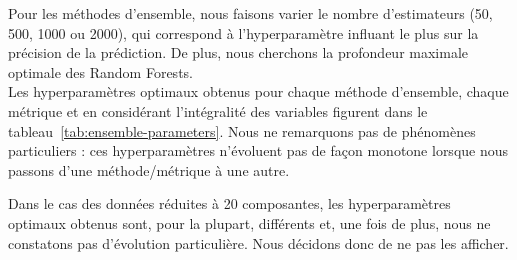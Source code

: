 \documentclass[12pt]{article}
\newcommand{\tabref}[1]{tableau~\ref{#1}}
\begin{document}

\begin{table}[H]
    \centering
    \caption{Paramètres optimaux pour le SVM}
    \label{tab:svm-parameters}
\end{table}

Pour les méthodes d'ensemble, nous faisons varier le nombre d'estimateurs (50,
500, 1000 ou 2000), qui correspond à l'hyperparamètre influant le plus sur la
précision de la prédiction. De plus, nous cherchons la profondeur maximale
optimale des Random Forests.  \\

Les hyperparamètres optimaux obtenus pour chaque méthode d'ensemble, chaque
métrique et en considérant l'intégralité des variables figurent dans le
\tabref{tab:ensemble-parameters}. Nous ne remarquons pas de phénomènes
particuliers : ces hyperparamètres n'évoluent pas de façon monotone lorsque nous
passons d'une méthode/métrique à une autre.
\begin{mdframed}[hidealllines=true,backgroundcolor=blue!20] Dans le cas des
    données réduites à 20 composantes, les hyperparamètres optimaux obtenus
    sont, pour la plupart, différents et, une fois de plus, nous ne constatons
pas d'évolution particulière. Nous décidons donc de ne pas les afficher. \\
\end{mdframed}
\end{document}
